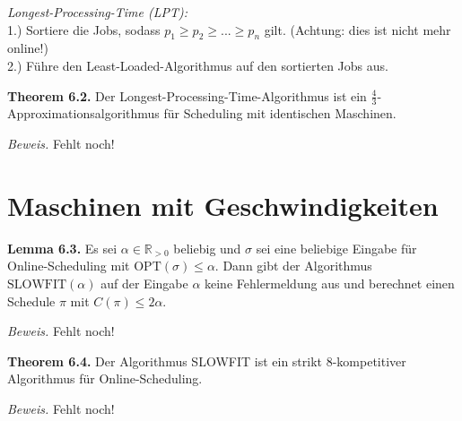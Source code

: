 \textit{Longest-Processing-Time (LPT):} \\
1.) Sortiere die Jobs, sodass $p_{1} \ge p_{2} \ge ... \ge p_{n}$  gilt. (Achtung: dies ist nicht mehr online!)\\
2.) Führe den Least-Loaded-Algorithmus auf den sortierten Jobs aus.

\textbf{Theorem 6.2.} Der Longest-Processing-Time-Algorithmus ist ein $\frac{4}{3}$-Approximationsalgorithmus für Scheduling mit identischen Maschinen.

\textit{Beweis.} Fehlt noch!



\section{Maschinen mit Geschwindigkeiten}

\textbf{Lemma 6.3.} Es sei $\alpha \in \mathbb{R}_{>0}$ beliebig und $\sigma$ sei eine beliebige Eingabe für Online-Scheduling mit $\textrm{OPT}(\sigma) \leq \alpha$. Dann gibt der Algorithmus $\textrm{SLOWFIT}(\alpha)$ auf der Eingabe $\alpha$ keine Fehlermeldung aus und berechnet einen Schedule $\pi$ mit $C(\pi) \leq 2 \alpha$.

\textit{Beweis.} Fehlt noch!


\textbf{Theorem 6.4.} Der Algorithmus SLOWFIT ist ein strikt 8-kompetitiver Algorithmus für Online-Scheduling.

\textit{Beweis.} Fehlt noch!
